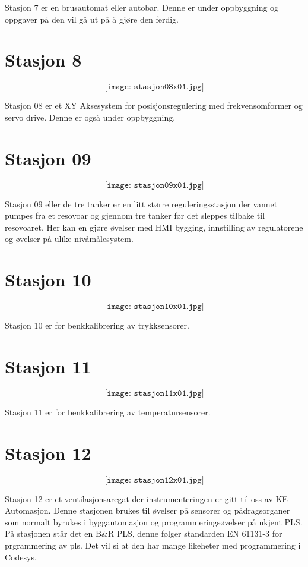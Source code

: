 Stasjon 7 er en brusautomat eller autobar. Denne er under oppbyggning og oppgaver på den vil gå ut på å gjøre den ferdig. 




\section{Stasjon 8}

$$\texttt{[image: stasjon08x01.jpg]}$$

Stasjon 08 er et XY Aksesystem  for posisjonsregulering med frekvensomformer og servo drive. Denne er også under oppbyggning. 

\section{Stasjon 09}

$$\texttt{[image: stasjon09x01.jpg]}$$

Stasjon 09 eller de tre tanker er en litt større reguleringsstasjon der vannet pumpes fra  et resovoar og gjennom tre tanker før det sleppes tilbake til resovoaret. Her kan en gjøre øvelser med HMI bygging, innstilling av regulatorene og øvelser på ulike nivåmålesystem. 

\section{Stasjon 10}

$$\texttt{[image: stasjon10x01.jpg]}$$

Stasjon 10 er for benkkalibrering av trykksensorer. 
\section{Stasjon 11}

$$\texttt{[image: stasjon11x01.jpg]}$$

Stasjon 11 er for benkkalibrering av temperatursensorer. 

\section{Stasjon 12}

$$\texttt{[image: stasjon12x01.jpg]}$$

Stasjon 12 er et ventilasjonsaregat der instrumenteringen er gitt til oss av KE Automasjon. Denne stasjonen brukes til øvelser på sensorer og pådragsorganer som normalt byrukes i byggautomasjon og programmeringsøvelser på ukjent PLS. På stasjonen står det en B\&R PLS, denne følger standarden EN 61131-3 for prgrammering av pls. Det vil si at den har mange likeheter med programmering i Codesys. 
